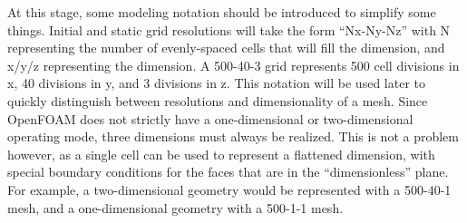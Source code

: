 At this stage, some modeling notation should be introduced to simplify some things. Initial and static grid resolutions will take the form ``Nx-Ny-Nz'' with N representing the number of evenly-spaced cells that will fill the dimension, and x/y/z representing the dimension. A 500-40-3 grid represents 500 cell divisions in x, 40 divisions in y, and 3 divisions in z. This notation will be used later to quickly distinguish between resolutions and dimensionality of a mesh. Since OpenFOAM does not strictly have a one-dimensional or two-dimensional operating mode, three dimensions must always be realized. This is not a problem however, as a single cell can be used to represent a flattened dimension, with special boundary conditions for the faces that are in the ``dimensionless'' plane. For example, a two-dimensional geometry would be represented with a 500-40-1 mesh, and a one-dimensional geometry with a 500-1-1 mesh. 

